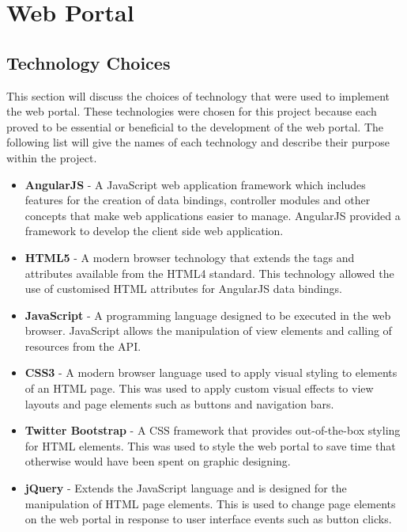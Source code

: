 \documentclass[11pt,a4paper]{report}
\begin{document}
\section{Web Portal}
\label{sec:web-portal-design}
\subsection{Technology Choices}

\label{sec:portal-technology-choices}



This section will discuss the choices of technology that were used to implement the web portal. These technologies were chosen for this project because each proved to be essential or beneficial to the development of the web portal. The following list will give the names of each technology and describe their purpose within the project.



\begin{itemize}

\item \textbf{AngularJS} - A JavaScript web application framework which includes features for the creation of data bindings, controller modules and other concepts that make web applications easier to manage. AngularJS provided a framework to develop the client side web application.

\item \textbf{HTML5} - A modern browser technology that extends the tags and attributes available from the HTML4 standard. This technology allowed the use of customised HTML attributes for AngularJS data bindings.

\item \textbf{JavaScript} - A programming language designed to be executed in the web browser. JavaScript allows the manipulation of view elements and calling of resources from the API.

\item \textbf{CSS3} - A modern browser language used to apply visual styling to elements of an HTML page. This was used to apply custom visual effects to view layouts and page elements such as buttons and navigation bars.

\item \textbf{Twitter Bootstrap} - A CSS framework that provides out-of-the-box styling for HTML elements. This was used to style the web portal to save time that otherwise would have been spent on graphic designing.

\item \textbf{jQuery} - Extends the JavaScript language and is designed for the manipulation of HTML page elements. This is used to change page elements on the web portal in response to user interface events such as button clicks.

\end{itemize}
\end{document}
